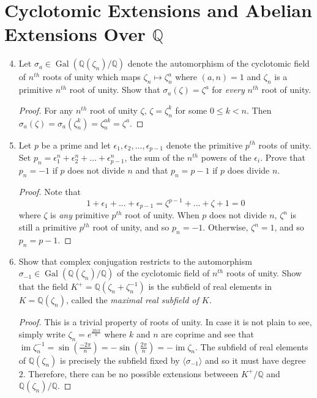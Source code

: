 \documentclass{report}
\newcommand{\Q}{\mathbb{Q}}
\DeclareMathOperator{\im}{im}
\DeclareMathOperator{\Gal}{Gal}
\begin{document}
\section{Cyclotomic Extensions and Abelian Extensions Over $\Q$}
\begin{enumerate} 
	\setcounter{enumi}{3}
	\item Let $\sigma_a\in\Gal(\Q(\zeta_n) / \Q)$ denote the automorphism of the cyclotomic field of $n^{th}$ roots of unity which maps $\zeta_n\mapsto\zeta_n^a$ 
		where $(a,n)=1$ and $\zeta_n$ is a primitive $n^{th}$ root of unity. Show that $\sigma_a(\zeta)=\zeta^a$ for \textit{every} $n^{th}$ root of unity.
		\begin{proof}
			For any $n^{th}$ root of unity $\zeta$, $\zeta=\zeta_n^k$ for some $0\leq k<n$. Then $\sigma_a(\zeta)=\sigma_a(\zeta_n^k)=\zeta_n^{ak}=\zeta^a$.
		\end{proof}
	\item Let $p$ be a prime and let $\epsilon_1,\epsilon_2,...,\epsilon_{p-1}$ denote the primitive $p^{th}$ roots of unity.
		Set $p_n=\epsilon_1^n+\epsilon_2^n+...+\epsilon_{p-1}^n$, the sum of the $n^{th}$ powers of the $\epsilon_i$.
		Prove that $p_n=-1$ if $p$ does not divide $n$ and that $p_n=p-1$ if $p$ does divide $n$.
		\begin{proof}
			Note that 
			$$1+\epsilon_1+...+\epsilon_{p-1}=\zeta^{p-1}+...+\zeta+1=0$$
			where $\zeta$ is \textit{any} primitive $p^{th}$ root of unity.
			When $p$ does not divide $n$, $\zeta^n$ is still a primitive $p^{th}$ root of unity, and so $p_n=-1$.
			Otherwise, $\zeta^n=1$, and so $p_n=p-1$.
		\end{proof}
		\setcounter{enumi}{6}
	\item Show that complex conjugation restricts to the automorphism $\sigma_{-1}\in\Gal(\Q(\zeta_n)/\Q)$ of the cyclotomic field of $n^{th}$ roots of unity.
		Show that the field $K^+=\Q(\zeta_n+\zeta_n^{-1})$ is the subfield of real elements in $K=\Q(\zeta_n)$, called the \textit{maximal real subfield of $K$}.
		\begin{proof}
			This is a trivial property of roots of unity. In case it is not plain to see, simply write $\zeta_n=e^{\frac{2ki\pi}{n}}$ where $k$ and $n$ are coprime
			and see that $\im\zeta_n^{-1}=\sin(\frac{-2\pi}{n})=-\sin(\frac{2\pi}{n})=-\im\zeta_n$. 
			The subfield of real elements of $\Q(\zeta_n)$ is precisely the subfield fixed by $\langle\sigma_{-1}\rangle$ and so it must have degree $2$.
			Therefore, there can be no possible extensions betweeen $K^+ / \Q$ and $\Q(\zeta_n) /\Q$.
		\end{proof}
		

\end{enumerate}
\end{document}

